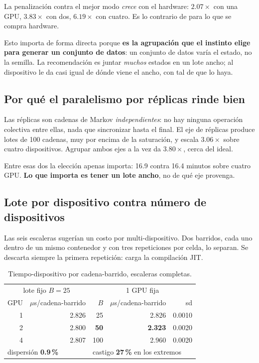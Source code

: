 \documentclass[11pt,a4paper]{article}
\begin{document}
La penalizaci\'on contra el mejor modo \emph{crece} con el hardware: $2.07\times$
con una GPU, $3.83\times$ con dos, $6.19\times$ con cuatro. Es lo contrario de
para lo que se compra hardware.

Esto importa de forma directa porque \textbf{es la agrupaci\'on que el instinto
elige para generar un conjunto de datos}: un conjunto de datos var\'ia el estado,
no la semilla. La recomendaci\'on es juntar \emph{muchos} estados en un lote
ancho; al dispositivo le da casi igual de d\'onde viene el ancho, con tal de que
lo haya.

\subsection{Por qu\'e el paralelismo por r\'eplicas rinde bien}

Las r\'eplicas son cadenas de Markov \emph{independientes}: no hay ninguna
operaci\'on colectiva entre ellas, nada que sincronizar hasta el final. El eje de
r\'eplicas produce lotes de 100 cadenas, muy por encima de la saturaci\'on, y
escala $3.06\times$ sobre cuatro dispositivos. Agrupar ambos ejes a la vez da
$3.80\times$, cerca del ideal.

Entre esas dos la elecci\'on apenas importa: 16.9 contra 16.4 minutos sobre cuatro
GPU. \textbf{Lo que importa es tener un lote ancho}, no de qu\'e eje provenga.

\subsection{Lote por dispositivo contra n\'umero de dispositivos}

Las seis escaleras suger\'ian un costo por multi-dispositivo. Dos barridos, cada
uno dentro de un mismo contenedor y con tres repeticiones por celda, lo separan.
Se descarta siempre la primera repetici\'on: carga la compilaci\'on JIT.

\begin{table}[h]\centering
\begin{tabular}{rr@{\qquad}rrr}
\toprule
\multicolumn{2}{c}{lote fijo $B=25$} & \multicolumn{3}{c}{1 GPU fija} \\
GPU & $\mu$s/cadena-barrido & $B$ & $\mu$s/cadena-barrido & sd \\
\midrule
1 & 2.826 & 25  & 2.826 & 0.0010 \\
2 & 2.800 & \textbf{50}  & \textbf{2.323} & 0.0020 \\
4 & 2.807 & 100 & 2.960 & 0.0020 \\
\midrule
\multicolumn{2}{l}{dispersi\'on \textbf{0.9\,\%}} & \multicolumn{3}{l}{castigo \textbf{27\,\%} en los extremos} \\
\bottomrule
\end{tabular}
\caption{Tiempo-dispositivo por cadena-barrido, escaleras completas.}
\end{table}
\end{document}
